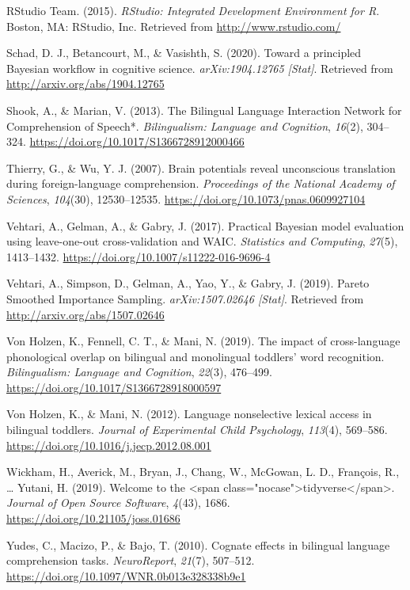 \documentclass[
  english,
  man,man,floatsintext]{apa6}
\begin{document}
\leavevmode\hypertarget{ref-rstudioteam2015}{}%
RStudio Team. (2015). \emph{RStudio: Integrated Development Environment for R}. Boston, MA: RStudio, Inc. Retrieved from \url{http://www.rstudio.com/}

\leavevmode\hypertarget{ref-schad2020}{}%
Schad, D. J., Betancourt, M., \& Vasishth, S. (2020). Toward a principled Bayesian workflow in cognitive science. \emph{arXiv:1904.12765 {[}Stat{]}}. Retrieved from \url{http://arxiv.org/abs/1904.12765}

\leavevmode\hypertarget{ref-shook2013}{}%
Shook, A., \& Marian, V. (2013). The Bilingual Language Interaction Network for Comprehension of Speech*. \emph{Bilingualism: Language and Cognition}, \emph{16}(2), 304--324. \url{https://doi.org/10.1017/S1366728912000466}

\leavevmode\hypertarget{ref-thierry2007}{}%
Thierry, G., \& Wu, Y. J. (2007). Brain potentials reveal unconscious translation during foreign-language comprehension. \emph{Proceedings of the National Academy of Sciences}, \emph{104}(30), 12530--12535. \url{https://doi.org/10.1073/pnas.0609927104}

\leavevmode\hypertarget{ref-vehtari2017}{}%
Vehtari, A., Gelman, A., \& Gabry, J. (2017). Practical Bayesian model evaluation using leave-one-out cross-validation and WAIC. \emph{Statistics and Computing}, \emph{27}(5), 1413--1432. \url{https://doi.org/10.1007/s11222-016-9696-4}

\leavevmode\hypertarget{ref-vehtari2019}{}%
Vehtari, A., Simpson, D., Gelman, A., Yao, Y., \& Gabry, J. (2019). Pareto Smoothed Importance Sampling. \emph{arXiv:1507.02646 {[}Stat{]}}. Retrieved from \url{http://arxiv.org/abs/1507.02646}

\leavevmode\hypertarget{ref-vonholzen2019}{}%
Von Holzen, K., Fennell, C. T., \& Mani, N. (2019). The impact of cross-language phonological overlap on bilingual and monolingual toddlers' word recognition. \emph{Bilingualism: Language and Cognition}, \emph{22}(3), 476--499. \url{https://doi.org/10.1017/S1366728918000597}

\leavevmode\hypertarget{ref-vonholzen2012}{}%
Von Holzen, K., \& Mani, N. (2012). Language nonselective lexical access in bilingual toddlers. \emph{Journal of Experimental Child Psychology}, \emph{113}(4), 569--586. \url{https://doi.org/10.1016/j.jecp.2012.08.001}

\leavevmode\hypertarget{ref-wickham2019}{}%
Wickham, H., Averick, M., Bryan, J., Chang, W., McGowan, L. D., François, R., \ldots{} Yutani, H. (2019). Welcome to the \textless span class="nocase"\textgreater tidyverse\textless/span\textgreater. \emph{Journal of Open Source Software}, \emph{4}(43), 1686. \url{https://doi.org/10.21105/joss.01686}

\leavevmode\hypertarget{ref-yudes2010}{}%
Yudes, C., Macizo, P., \& Bajo, T. (2010). Cognate effects in bilingual language comprehension tasks. \emph{NeuroReport}, \emph{21}(7), 507--512. \url{https://doi.org/10.1097/WNR.0b013e328338b9e1}

\endgroup
\end{document}
